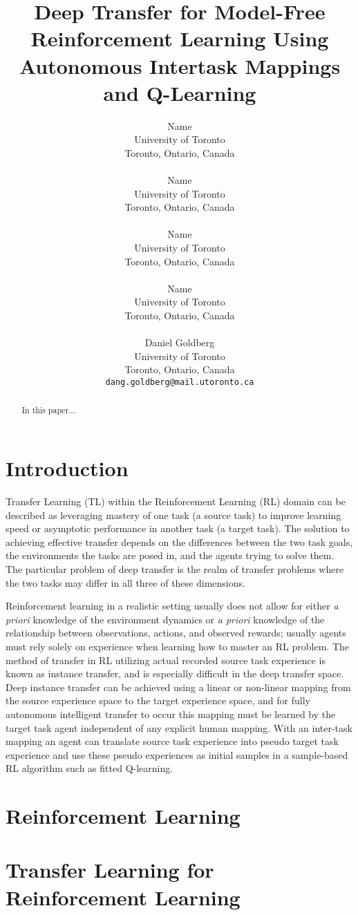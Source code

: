 \documentclass{article}
\title{Deep Transfer for Model-Free Reinforcement Learning Using Autonomous Intertask Mappings and Q-Learning}
\author{
  Name \\
  University of Toronto \\
  Toronto, Ontario, Canada \\
  \texttt{} \\
  \And
  Name \\
  University of Toronto \\
  Toronto, Ontario, Canada \\
  \texttt{} \\
  \And
  Name \\
  University of Toronto \\
  Toronto, Ontario, Canada \\
  \texttt{} \\
  \And
  Name \\
  University of Toronto \\
  Toronto, Ontario, Canada \\
  \texttt{} \\
  \And
  Daniel Goldberg\\
  University of Toronto\\
  Toronto, Ontario, Canada \\
  \texttt{dang.goldberg@mail.utoronto.ca} \\
}
\begin{document}

\maketitle

\begin{abstract}
  In this paper...
\end{abstract}

\section{Introduction}
Transfer Learning (TL) within the Reinforcement Learning (RL) domain can be described as leveraging mastery of one task (a source task) to improve learning speed or asymptotic performance in another task (a target task). The solution to achieving effective transfer depends on the differences between the two task goals, the environments the tasks are posed in, and the agents trying to solve them. The particular problem of deep transfer is the realm of transfer problems where the two tasks may differ in all three of these dimensions.

	Reinforcement learning in a realistic setting usually does not allow for either  \emph{a priori} knowledge of the environment dynamics or \emph{a priori} knowledge of the relationship between observations, actions, and observed rewards; usually agents must rely solely on experience when learning how to master an RL problem. The method of transfer in RL utilizing actual recorded source task experience is known as instance transfer, and is especially difficult in the deep transfer space. Deep instance transfer can be achieved using a linear or non-linear mapping from the source experience space to the target experience space, and for fully autonomous intelligent transfer to occur this mapping must be learned by the target task agent independent of any explicit human mapping. With an inter-task mapping an agent can translate source task experience into pseudo target task experience and use these pseudo experiences as initial samples in a sample-based RL algorithm such as fitted Q-learning.


\section{Reinforcement Learning}

\section{Transfer Learning for Reinforcement Learning}
\end{document}
